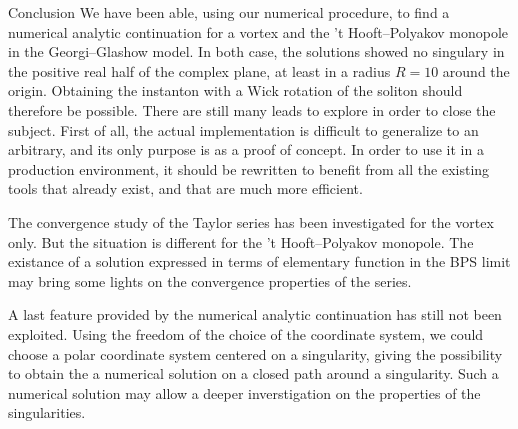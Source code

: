 \begin{section}{Conclusion}
  We have been able, using our numerical procedure, to find a
  numerical analytic continuation for a vortex and the 't
  Hooft--Polyakov monopole in the Georgi--Glashow model. In both case,
  the solutions showed no singulary in the positive real half of the
  complex plane, at least in a radius $R=10$ around the
  origin. Obtaining the instanton with a Wick rotation of the soliton
  should therefore be possible.  There are still many leads to explore
  in order to close the subject. First of all, the actual
  implementation is difficult to generalize to an arbitrary, and its
  only purpose is as a proof of concept. In order to use it in a
  production environment, it should be rewritten to benefit from all
  the existing tools that already exist, and that are much more
  efficient.

  The convergence study of the Taylor series has been investigated
  for the vortex only. But the situation is different for the 't
  Hooft--Polyakov monopole.  The existance of a solution expressed in
  terms of elementary function in the BPS limit may bring some lights
  on the convergence properties of the series.

  A last feature provided by the numerical analytic continuation has
  still not been exploited. Using the freedom of the choice of the
  coordinate system, we could choose a polar coordinate system
  centered on a singularity, giving the possibility to obtain the a
  numerical solution on a closed path around a singularity. Such a
  numerical solution may allow a deeper inverstigation on the
  properties of the singularities.


\end{section}
